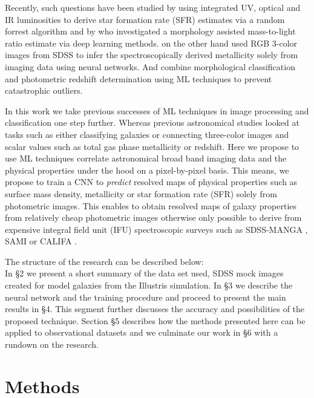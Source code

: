 \documentclass[conference]{IEEEtran}
\begin{document}
Recently, such questions have been studied by \cite{Bonjean2019} using integrated UV, optical and IR luminosities to derive star formation rate (SFR) estimates via a random forrest algorithm and by \cite{Dobbels2019} who investigated a morphology assisted mass-to-light ratio estimate via deep learning methods. \cite{Wu2019} on the other hand used RGB 3-color images from SDSS to infer the spectroscopically derived metallicity solely from imaging data using neural networks. And \cite{Diego2021} combine morphological classification and photometric redshift determination using ML techniques to prevent catastrophic outliers.

In this work we take previous successes of ML techniques in image processing and classification one step further. Whereas previous astronomical studies looked at tasks such as either classifying galaxies \citep[e.g.][]{Dominguez2018} or connecting three-color images and scalar values such as total gas phase metallicity \citep[e.g.][]{Wu2019} or redshift. Here we propose to use ML techniques correlate astronomical broad band imaging data and the physical properties under the hood on a pixel-by-pixel basis. This means, we propose to train a CNN to \textit{predict} resolved maps of physical properties such as surface mass density, metallicity or star formation rate (SFR) solely from photometric images. This enables to obtain resolved maps of galaxy properties from relatively cheap photometric images otherwise only possible to derive from expensive integral field unit (IFU) spectroscopic surveys such as SDSS-MANGA \citep{manga2015}, SAMI \citep{sami2015} or CALIFA \citep{califa2012}.

The structure of the research can be described below:\\
In \S2 we present a short summary of the data set used, SDSS mock images created for model galaxies from the Illustris simulation. In \S3 we describe the neural network and the training procedure and proceed to present the main results in \S4. This segment further discusses the accuracy and possibilities of the proposed technique. Section \S5 describes how the methods presented here can be applied to observational datasets and we culminate our work in \S6 with a rundown on the research.


\section{Methods} \label{sec:method}
\end{document}

